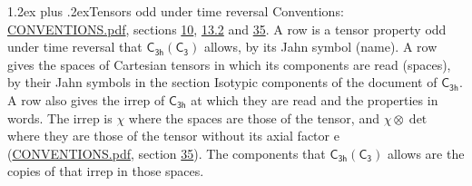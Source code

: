 \documentclass[10pt,a4paper]{article}
\makeatletter
\renewcommand\section{\@startsection{section}{1}{\z@}{-3ex plus -1ex minus -.2ex}%
  {1.2ex plus .2ex}{\normalfont\large\sffamily\bfseries\color{parttitle}}}
\numberwithin{equation}{section}
\newcommand{\grp}[1]{\mathsf{#1}}
\newcommand{\irrprod}{\otimes}
\makeatother
\begin{document}
\section{Tensors odd under time reversal}\label{s:time_odd}
Conventions: \href{../../CONVENTIONS.pdf}{CONVENTIONS.pdf}, sections \href{../../../rotation/CONVENTIONS.pdf\#conv.10}{10}, \href{../../../rotation/CONVENTIONS.pdf\#conv.13.2}{13.2} and \href{../../CONVENTIONS.pdf\#conv.35}{35}.
\leavevmode\label{n:head.name.property}A row is a tensor property odd under time reversal that $\grp{C_{3h}}(\grp{C_{3}})$ allows, by its Jahn symbol (name). \label{n:head.spaces}A row gives the spaces of Cartesian tensors in which its components are read (spaces), by their Jahn symbols in the section Isotypic components of the document of \href{../../../rotation/data/pdf/C3h.pdf}{$\grp{C_{3h}}$}. \label{n:head.properties}A row also gives the irrep of $\grp{C_{3h}}$ at which they are read and the properties in words. The irrep is $\chi$ where the spaces are those of the tensor, and $\chi \irrprod \det$ where they are those of the tensor without its axial factor e (\href{../../CONVENTIONS.pdf}{CONVENTIONS.pdf}, section \href{../../CONVENTIONS.pdf\#conv.35}{35}). The components that $\grp{C_{3h}}(\grp{C_{3}})$ allows are the copies of that irrep in those spaces.
\end{document}
